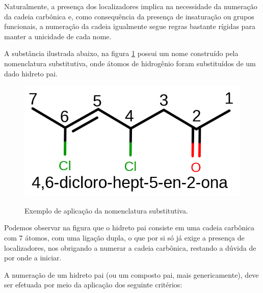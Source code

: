 \documentclass[a4paper,12pt]{book}
\begin{document}
Naturalmente, a presença dos localizadores implica na necessidade da numeração da cadeia carbônica e, como consequência da presença de insaturação ou grupos funcionais, a numeração da cadeia igualmente segue regras bastante rígidas para manter a unicidade de cada nome.

A substância ilustrada abaixo, na figura \ref{fig:46} possui um nome construído pela nomenclatura substitutiva, onde átomos de hidrogênio foram substituídos de um dado hidreto pai.

\begin{figure}[h]
	\centering
	\caption{Exemplo de aplicação da nomenclatura substitutiva.}
	\vspace{0.5cm}
	\includegraphics[width=0.45\linewidth]{imagens/46dicloro.png}
\label{fig:46}
\end{figure}

Podemos observar na figura que o hidreto pai consiste em uma cadeia carbônica com 7 átomos, com uma ligação dupla, o que por si só já exige a presença de localizadores, nos obrigando a numerar a cadeia carbônica, restando a dúvida de por onde a iniciar.

A numeração de um hidreto pai (ou um composto pai, mais genericamente), deve ser efetuada por meio da aplicação dos seguinte critérios:
\end{document}
